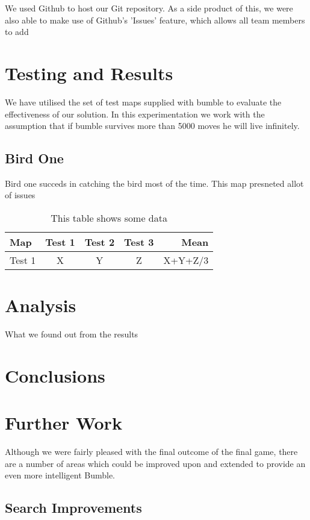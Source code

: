 \documentclass[a4paper,oneside]{report}
\begin{document}
We used Github to host our Git repository. As a side product of this, we were also able to make use of Github's 'Issues' feature, which allows all team members to add 
	
\section{Testing and Results}

We have utilised the set of test maps supplied with bumble to evaluate the effectiveness of our solution. In this experimentation we work with the assumption that if bumble survives more than 5000 moves he will live infinitely.
	
	\subsection{Bird One}
	Bird one succeds in catching the bird most of the time. This map presneted allot of issues 
	
	
\begin{table}[h!]
	\centering
	\begin{tabular}{| l | c | c | c | r |}
	\hline
		Map & Test 1 & Test 2 & Test 3 & Mean \\ \hline
		Test 1 &  X & Y & Z & X+Y+Z/3 \\ \hline
	\end{tabular}
	\caption{This table shows some data}
	\label{tab:myfirsttable}
\end{table}

\section{Analysis}

What we found out from the results

\section{Conclusions}

\section{Further Work}

Although we were fairly pleased with the final outcome of the final game, there are a number of areas which could be improved upon and extended to provide an even more intelligent Bumble.
	
\subsection{Search Improvements}
\end{document}
